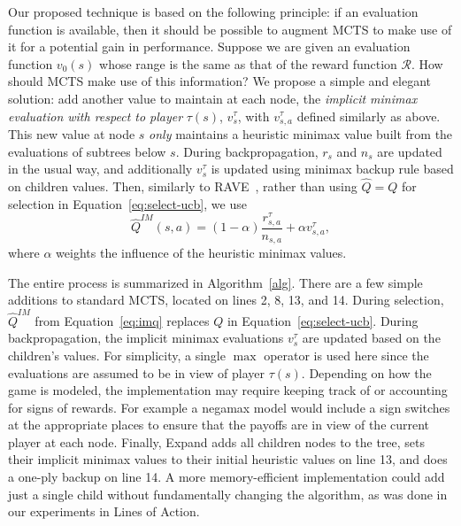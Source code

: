 \documentclass{article}
\newcommand{\cR}{\mathcal{R}}
\newcommand{\hQ}{\hat{Q}}
\newcommand{\Expand}{{\sc Expand}}
\begin{document}
Our proposed technique is based on the following principle: if an evaluation function is available, then it should 
be possible to augment MCTS to make use of it for a potential gain in performance.  
Suppose we are given an evaluation function $v_0(s)$ whose range is the same as that of the reward function $\cR$. 
How should MCTS make use of this information? 
We propose a simple and elegant solution: add another value to maintain at each node, the 
{\it implicit minimax evaluation with respect to player} $\tau(s)$, $v^{\tau}_s$, with $v^{\tau}_{s,a}$ defined similarly 
as above. 
This new value at node $s$ {\it only} maintains a heuristic minimax value built from the evaluations of subtrees below $s$. 
During backpropagation, $r_s$ and $n_s$ are updated in the usual way, and additionally $v^{\tau}_s$ is updated using minimax backup 
rule based on children values. Then, similarly to RAVE~\cite{Gelly07Combining}, rather than using $\hQ = Q$ for 
selection in Equation~\ref{eq:select-ucb}, we use
\begin{equation}
\label{eq:imq}
\hQ^{\mathit{IM}}(s,a) = (1-\alpha) \frac{r^{\tau}_{s,a}}{n_{s,a}} + \alpha v^{\tau}_{s,a}, 
\end{equation}
where $\alpha$ weights the influence of the heuristic minimax values.

The entire process is summarized in Algorithm~\ref{alg}. There are a few simple additions to standard MCTS,
located on lines 2, 8, 13, and 14.
During selection, $\hQ^{\mathit{IM}}$ from Equation~\ref{eq:imq} replaces $Q$ in 
Equation~\ref{eq:select-ucb}. During backpropagation, the implicit minimax evaluations $v^{\tau}_s$ are updated based on 
the children's values. For simplicity, a single $\max$ operator is used here since the evaluations are assumed to be in 
view of player $\tau(s)$. Depending on how the game is modeled, the implementation may require keeping track of or  
accounting for signs of rewards. For example a negamax model would include a sign switches at the appropriate places 
to ensure that the payoffs are in view of the current player at each node.  
Finally, \Expand\xspace adds all children nodes to the tree, sets their implicit minimax values to their initial
heuristic values on line 13, and does a one-ply backup on line 14. 
A more memory-efficient implementation could add just a single child without fundamentally changing
the algorithm, as was done in our experiments in Lines of Action.
\end{document}
